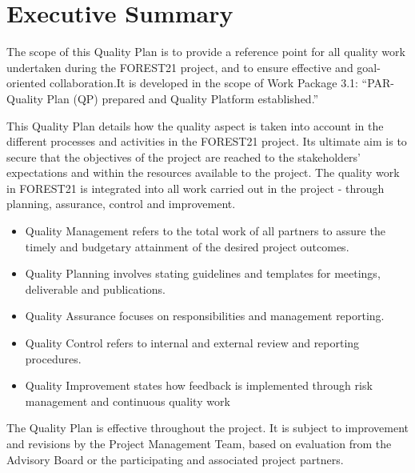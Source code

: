 \documentclass[
  11pt,
]{article}
\providecommand{\tightlist}{%
  \setlength{\itemsep}{0pt}\setlength{\parskip}{0pt}}
\begin{document}
\clearpage

\renewcommand{\baselinestretch}{0.6}\normalsize
\setcounter{tocdepth}{3}
\tableofcontents
\renewcommand{\baselinestretch}{1.0}\normalsize

\clearpage

\listoffigures
\listoftables

\clearpage

\hypertarget{executive-summary}{%
\section*{Executive Summary}\label{executive-summary}}

The scope of this Quality Plan is to provide a reference point for all
quality work undertaken during the FOREST21 project, and to ensure
effective and goal-oriented collaboration.It is developed in the scope
of Work Package 3.1: ``PAR-Quality Plan (QP) prepared and Quality
Platform established.''

This Quality Plan details how the quality aspect is taken into account
in the different processes and activities in the FOREST21 project. Its
ultimate aim is to secure that the objectives of the project are reached
to the stakeholders' expectations and within the resources available to
the project. The quality work in FOREST21 is integrated into all work
carried out in the project - through planning, assurance, control and
improvement.

\begin{itemize}
\tightlist
\item
  Quality Management refers to the total work of all partners to assure
  the timely and budgetary attainment of the desired project outcomes.
\item
  Quality Planning involves stating guidelines and templates for
  meetings, deliverable and publications.
\item
  Quality Assurance focuses on responsibilities and management
  reporting.
\item
  Quality Control refers to internal and external review and reporting
  procedures.
\item
  Quality Improvement states how feedback is implemented through risk
  management and continuous quality work
\end{itemize}

The Quality Plan is effective throughout the project. It is subject to
improvement and revisions by the Project Management Team, based on
evaluation from the Advisory Board or the participating and associated
project partners.
\end{document}
